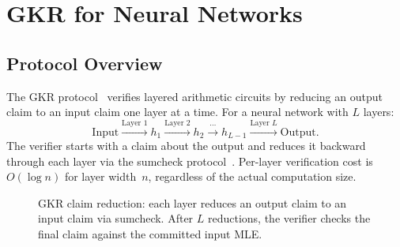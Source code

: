 \documentclass[10pt,twocolumn]{article}
\theoremstyle{definition}
\theoremstyle{remark}
\begin{document}
\section{GKR for Neural Networks}\label{sec:gkr}

\subsection{Protocol Overview}

The GKR protocol~\cite{goldwasser2015delegating, thaler2013time} verifies
layered arithmetic circuits by reducing an output claim to an input
claim one layer at a time.
For a neural network with $L$ layers:
\[
  \text{Input} \xrightarrow{\text{Layer 1}} h_1
  \xrightarrow{\text{Layer 2}} h_2
  \xrightarrow{\;\cdots\;}
  h_{L-1} \xrightarrow{\text{Layer }L} \text{Output}.
\]
The verifier starts with a claim about the output and reduces it
backward through each layer via the sumcheck
protocol~\cite{lund1992algebraic}.
Per-layer verification cost is $O(\log n)$ for layer width~$n$,
regardless of the actual computation size.

\begin{figure}[t]
  \centering
  \caption{GKR claim reduction: each layer reduces an output claim to an
           input claim via sumcheck. After $L$ reductions, the verifier
           checks the final claim against the committed input MLE.}
  \label{fig:gkr-reduction}
\end{figure}
\end{document}
